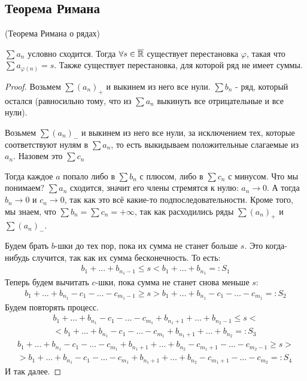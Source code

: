 \subsection{Теорема Римана}
\begin{theorem}
    (Теорема Римана о рядах)

    $\sum a_n$ условно сходится. Тогда $\forall s \in \overline {\mathbb{R}}$ существует перестановка $\varphi$,
     такая что $\sum a_{\varphi(n)} = s$. Также существует перестановка, для которой ряд не имеет суммы.
\end{theorem}
\begin{proof}
    Возьмем $\sum(a_n)_+$ и выкинем из него все нули. $\sum b_n$ - ряд, который остался (равносильно тому, что из $\sum a_n$ выкинуть все отрицательные и все нули).

    Возьмем $\sum(a_n)_-$ и выкинем из него все нули, за исключением тех, которые соответствуют нулям в $\sum a_n$, то есть выкидываем положительные слагаемые из $a_n$. Назовем это $\sum c_n$

    Тогда каждое $a$ попало либо в $\sum b_n$ с плюсом, либо в $\sum c_n$ с минусом.
    Что мы понимаем? $\sum a_n$ сходится, значит его члены стремятся к нулю: $a_n \to 0$. А тогда $b_n \to 0$ и $ c_n \to 0$, так как это всё какие-то подпоследовательности. 
    Кроме того, мы знаем, что $\sum b_n = \sum c_n = +\infty$, так как расходились ряды $\sum(a_n)_+$ и $\sum(a_n)_-$.

    Будем брать $b$-шки до тех пор, пока их сумма не станет больше $s$. Это когда-нибудь случится, так как их сумма бесконечность. То есть:
    \begin{gather*}
        b_1 + \ldots + b_{n_1 - 1} \leqslant s < b_1 + \ldots + b_{n_1} =: S_1
    \end{gather*}
    Теперь будем вычитать $c$-шки, пока сумма не станет снова меньше $s$:
    \begin{gather*}
        b_1 + \ldots + b_{n_1} - c_1 - \ldots - c_{m_1 - 1} \geqslant s > b_1 + \ldots + b_{n_1} - c_1 - \ldots - c_{m_1} =: S_2
    \end{gather*}
    Будем повторять процесс.
    \begin{gather*}
        b_1 + \ldots + b_{n_1} - c_1 - \ldots -  c_{m_1} + b_{n_1 + 1} + \ldots + b_{n_2-1} \leqslant s < \\
        < b_1 + \ldots + b_{n_1} - c_1 - \ldots -  c_{m_1} + b_{n_1 + 1} + \ldots + b_{n_2} =: S_3
    \end{gather*}
    \begin{gather*}
        b_1 + \ldots + b_{n_1} - c_1 - \ldots -  c_{m_1} + b_{n_1 + 1} + \ldots + b_{n_2} - c_{m_1+1} - \ldots - c_{m_2-1} \geqslant s > \\
         > b_1 + \ldots + b_{n_1} - c_1 - \ldots -  c_{m_1} + b_{n_1 + 1} + \ldots + b_{n_2} - c_{m_1+1} - \ldots - c_{m_2} =: S_4
    \end{gather*}
    И так далее.


\end{proof}
